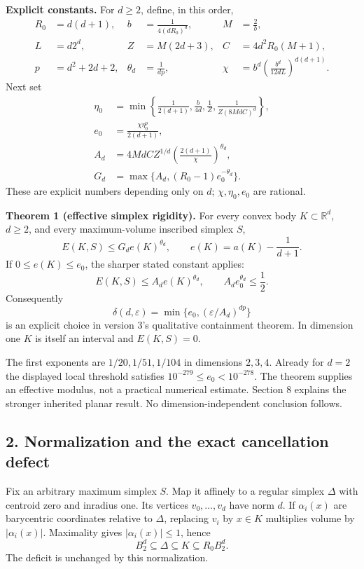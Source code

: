 \documentclass[
  11pt,
]{article}
\begin{document}
\textbf{Explicit constants.} For \(d\ge2\), define, in this order,
\[\begin{aligned}
R_0&=d(d+1),& b&=\frac1{4(dR_0)^d},&M&=\frac2b,\\
L&=d2^d,&Z&=M(2d+3),&C&=4d^2R_0(M+1),\\
p&=d^2+2d+2,&\theta_d&=\frac1{dp},&
\chi&=b^d\left(\frac{b^d}{12dL}\right)^{d(d+1)}.
\end{aligned}\] Next set \[\begin{aligned}
\eta_0&=\min\left\{\frac1{2(d+1)},\frac b{4d},\frac1Z,
                  \frac1{Z(8MdC)^d}\right\},\\
e_0&=\frac{\chi\eta_0^p}{2(d+1)},\\
A_d&=4MdC Z^{1/d}\left(\frac{2(d+1)}\chi\right)^{\theta_d},\\
G_d&=\max\{A_d,(R_0-1)e_0^{-\theta_d}\}.
\end{aligned}\] These are explicit numbers depending only on \(d\);
\(\chi,\eta_0,e_0\) are rational.

\textbf{Theorem 1 (effective simplex rigidity).} For every convex body
\(K\subset\mathbb R^d\), \(d\ge2\), and every maximum-volume inscribed
simplex \(S\),
\[E(K,S)\le G_d e(K)^{\theta_d},\qquad e(K)=a(K)-\frac1{d+1}.\] If
\(0\le e(K)\le e_0\), the sharper stated constant applies:
\[E(K,S)\le A_d e(K)^{\theta_d},\qquad A_de_0^{\theta_d}\le\frac12.\]
Consequently
\[\delta(d,\varepsilon)=\min\{e_0,(\varepsilon/A_d)^{dp}\}\] is an
explicit choice in version 3's qualitative containment theorem. In
dimension one \(K\) is itself an interval and \(E(K,S)=0\).

The first exponents are \(1/20,1/51,1/104\) in dimensions \(2,3,4\).
Already for \(d=2\) the displayed local threshold satisfies
\(10^{-279}\le e_0<10^{-278}\). The theorem supplies an effective
modulus, not a practical numerical estimate. Section 8 explains the
stronger inherited planar result. No dimension-independent conclusion
follows.

\subsection{2. Normalization and the exact cancellation
defect}\label{normalization-and-the-exact-cancellation-defect}

Fix an arbitrary maximum simplex \(S\). Map it affinely to a regular
simplex \(\Delta\) with centroid zero and inradius one. Its vertices
\(v_0,\ldots,v_d\) have norm \(d\). If \(\alpha_i(x)\) are barycentric
coordinates relative to \(\Delta\), replacing \(v_i\) by \(x\in K\)
multiplies volume by \(|\alpha_i(x)|\). Maximality gives
\(|\alpha_i(x)|\le1\), hence
\[B_2^d\subseteq\Delta\subseteq K\subseteq R_0 B_2^d.\tag{2.1}\] The
deficit is unchanged by this normalization.
\end{document}

